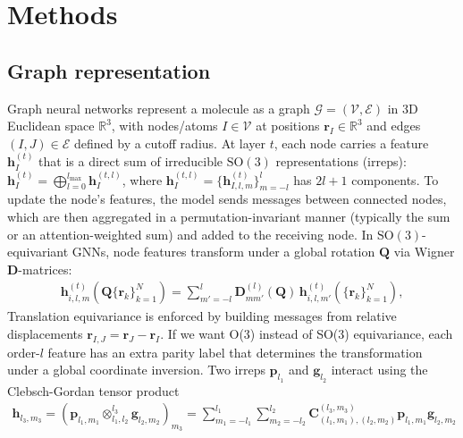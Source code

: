 \documentclass[pdflatex,sn-mathphys-num]{sn-jnl}%
\theoremstyle{thmstyleone}%
\theoremstyle{thmstyletwo}%
\theoremstyle{thmstylethree}%
\begin{document}



\section{Methods}

\subsection{Graph representation}
Graph neural networks represent a molecule as a graph $\mathcal{G}=(\mathcal{V},\mathcal{E})$ in 3D Euclidean space $\mathbb{R}^3$, with nodes/atoms $I\in\mathcal{V}$ at positions $\mathbf{r}_I\in\mathbb{R}^3$ and edges $(I,J)\in\mathcal{E}$ defined by a cutoff radius. At layer $t$, each node carries a feature $\mathbf{h}_I^{(t)}$ that is a direct sum of irreducible $\mathrm{SO}(3)$ representations (irreps): $\mathbf{h}_I^{(t)}=\bigoplus_{l=0}^{l_{\max}}\mathbf{h}_{I}^{(t,l)}$, where $\mathbf{h}_{I}^{(t,l)}=\{\mathbf{h}^{(t)}_{I,l,m}\}_{m=-l}^{l}$ has $2l+1$ components. To update the node's features, the model sends messages between connected nodes, which are then aggregated in a permutation-invariant manner (typically the sum or an attention-weighted sum) and added to the receiving node.
In $\mathrm{SO}(3)$-equivariant GNNs, node features transform under a global rotation $\mathbf{Q}$ via Wigner $\mathbf{D}$-matrices:
\begin{align}
\mathbf{h}^{(t)}_{i,l,m}\!\left(\mathbf{Q}\{\mathbf{r}_k\}_{k=1}^N\right)
= \sum_{m'=-l}^{l} \mathbf{D}^{(l)}_{m m'}(\mathbf{Q})\,\mathbf{h}^{(t)}_{i,l,m'}\!\left(\{\mathbf{r}_k\}_{k=1}^N\right),
\label{eq:so3-transform}
\end{align}
Translation equivariance is enforced by building messages from relative displacements $\mathbf{r}_{I,J}=\mathbf{r}_J-\mathbf{r}_I$. If we want O(3) instead of SO(3) equivariance, each order-$l$ feature has an extra parity label that determines the transformation under a global coordinate inversion.
%
Two irreps $\mathbf{p}_{l_1}$ and $\mathbf{g}_{l_2}$ interact using the Clebsch-Gordan tensor product \citep{thomas2018}
\begin{align}
    \mathbf{h}_{l_3,m_3} = \left( \mathbf{p}_{l_1,m_1} \otimes_{l_1, l_2}^{l_3} \mathbf{g}_{l_2,m_2} \right)_{m_3} = \sum_{m_1 = -l_1}^{l_1} \sum_{m_2 = -l_2}^{l_2} \mathbf{C}_{(l_1,m_1),(l_2,m_2)}^{(l_3,m_3)} \mathbf{p}_{l_1,m_1} \mathbf{g}_{l_2,m_2} \label{eq:tp}
\end{align}
\end{document}
